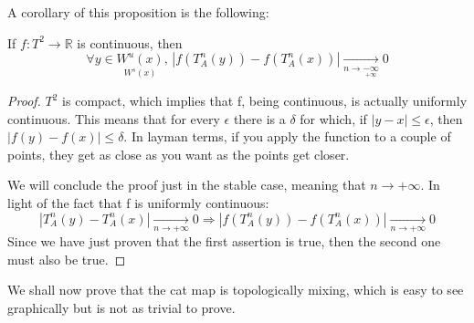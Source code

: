 A corollary of this proposition is the following:
\begin{proposition}
    If $f: T^2\rightarrow\mathbb{R}$ is continuous, then \begin{equation*}
        \forall y \in \underset{W^{s}(x)}{W^{u}(x)},\,|f(T_A^n(y))-f(T_A^n(x))|\underset{n\rightarrow\underset{+\infty}{-\infty}}{\longrightarrow} 0
    \end{equation*}
\end{proposition}
\begin{proof}
    $T^2$ is compact, which implies that f, being continuous, is actually uniformly continuous. This means that for every $\epsilon$ there is a $\delta$ for which, if $|y-x|\leq\epsilon$, then $|f(y)-f(x)|\leq \delta$. In layman terms, if you apply the function to a couple of points, they get as close as you want as the points get closer.

    We will conclude the proof just in the stable case, meaning that $n\rightarrow+\infty$. In light of the fact that f is uniformly continuous:\begin{equation*}
        |T_A^n(y)-T_A^n(x)|\underset{n\rightarrow+\infty}{\longrightarrow} 0\Rightarrow|f(T_A^n(y))-f(T_A^n(x))|\underset{n\rightarrow+\infty}{\longrightarrow} 0
    \end{equation*}
    Since we have just proven that the first assertion is true, then the second one must also be true.
\end{proof}

We shall now prove that the cat map is topologically mixing, which is easy to see graphically but is not as trivial to prove.

